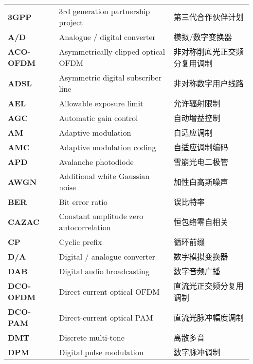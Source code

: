 ﻿%
\begin{terminology}
    \begin{longtable}{lll}
        \bf{3GPP}        &	3rd generation partnership project        &	第三代合作伙伴计划	\\
        \bf{A/D}         &	Analogue / digital converter                &	模拟/数字变换器	\\
        \bf{ACO-OFDM}    &	Asymmetrically-clipped optical OFDM       &	非对称削底光正交频分复用调制	\\
        \bf{ADSL}        &	Asymmetric digital subscriber line        &	非对称数字用户线路	\\
        \bf{AEL}         &	Allowable exposure limit                  &	允许辐射限制	\\
        \bf{AGC}         &  Automatic gain control                         & 自动增益控制    \\
        \bf{AM}          &	Adaptive modulation                       &	自适应调制	\\
        \bf{AMC}         &	Adaptive modulation coding                &	自适应调制编码	\\
        \bf{APD}         &	Avalanche photodiode                      &	雪崩光电二极管	\\
        \bf{AWGN}        &	Additional white Gaussian noise           &	加性白高斯噪声	\\
        \bf{BER}         &   Bit error ratio                           & 误比特率	\\
        \bf{CAZAC}       &	Constant amplitude zero autocorrelation   &	恒包络零自相关	\\
        \bf{CP}          &	Cyclic prefix                             &	循环前缀	\\
        \bf{D/A}         &	Digital / analogue converter                &	数字模拟变换器	\\
        \bf{DAB}         &	Digital audio broadcasting                &	数字音频广播	\\
        \bf{DCO-OFDM}    &	Direct-current optical OFDM               &	直流光正交频分复用调制	\\
        \bf{DCO-PAM}     &	Direct-current optical PAM                &	直流光脉冲幅度调制	\\
        \bf{DMT}         &	Discrete multi-tone                       &	离散多音	\\
        \bf{DPM}         &	Digital pulse modulation                  &	数字脉冲调制	\\

\end{longtable}
\end{terminology}
